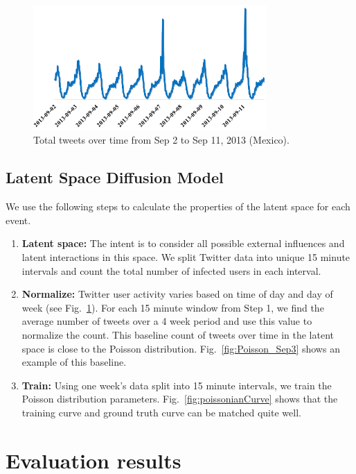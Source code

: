 \begin{figure}[ht]
\centering
\includegraphics[width=3.5in] {figures/Baseline.png}
\caption{Total tweets over time from Sep 2 to Sep 11, 2013 (Mexico).}
\label{fig:Baseline}
\end{figure}

\subsection{Latent Space Diffusion Model}
We use the following steps to calculate the properties of the latent space for each event.

\begin{enumerate}
  \item \textbf{Latent space:} The intent is
to consider all possible external influences and latent interactions in this space. We split Twitter data into unique 15 minute intervals and count the total
number of infected users in each interval.
  \item \textbf{Normalize:} Twitter user activity varies based on time of day and day of week (see Fig.~\ref{fig:Baseline}). For each 15 minute window from Step 1, we find the average number of tweets over a 4 week period and use this value to normalize the count. This baseline count of tweets over time in the latent space is close to the Poisson distribution.
  Fig.~\ref{fig:Poisson_Sep3} shows an example of this baseline.
  \item \textbf{Train: } Using one week's data split into 15 minute intervals, we train the Poisson distribution parameters.
  Fig.~\ref{fig:poissonianCurve} shows that the training curve and ground truth curve can be matched quite well.
\end{enumerate}


\section{Evaluation results}

